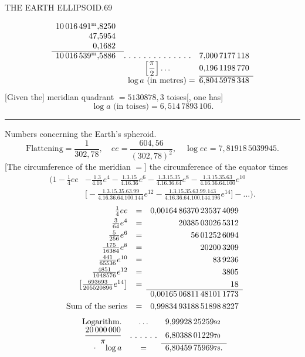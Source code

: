 \clearpage
\noindent\mbox{}\hfill THE EARTH ELLIPSOID.\hfill 69\par
\[
\begin{array}{r@{\quad}c@{\quad}r}
10\,016\,491^{\mathrm m}{,}8250&&\\
47{,}5954&&\\
0{,}1682&&\\\cline{1-1}
10\,016\,539^{\mathrm m}{,}5886&\ldotp\,\ldotp\,\ldotp\,\ldotp\,\ldotp\,\ldotp\,\ldotp\,\ldotp\,\ldotp\,\ldotp\,\ldotp\,\ldotp\,\ldotp\,\ldotp&7{,}000\,7177\,118\\
&\left[\dfrac\pi2\right]\ldots&0{,}196\,1198\,770\\\cline{3-3}
\multicolumn{2}{r}{\log a\text{ (in metres)}=}&6{,}804\,5978\,348
\end{array}
\]
[Given the] meridian quadrant $=5130878{,}3$ toises[, one has]
\[
\log a\text{ (in toises)}=6{,}514\,7893\,106.
\]
\begin{center}\rule{.25\textwidth}{.4pt}\end{center}
Numbers concerning the Earth's spheroid.
\[
\text{Flattening}=\frac1{302{,}78},\quad ee=\frac{604{,}56}{(302{,}78)^2},\quad\log ee=7{,}81918\,50399{\scriptstyle45}.
\]
[The circumference of the meridian $=$] the circumference of the equator times
\[
\begin{aligned}
\bigg(1-\tfrac14ee&-\frac{1.3}{4.16}e^4-\frac{1.3.15}{4.16.36}e^6-\frac{1.3.15.35}{4.16.36.64}e^8-\frac{1.3.15.35.63}{4.16.36.64.100}e^{10}\\
&\bigg[-\frac{1.3.15.35.63.99}{4.16.36.64.100.144}e^{12}-\frac{1.3.15.35.63.99.143}{4.16.36.64.100.144.196}e^{14}\bigg]-\ldots\bigg).
\end{aligned}
\]
\[
\begin{array}{rcl}
\tfrac14ee&=&\multicolumn{1}{r}{0{,}00164\,86370\,23537\,4099}\\[3pt]
\tfrac3{64}e^4&=&\multicolumn{1}{r}{20385\,03026\,5312}\\[3pt]
\tfrac5{256}e^6&=&\multicolumn{1}{r}{56\,01252\,6094}\\[3pt]
\tfrac{175}{16384}e^8&=&\multicolumn{1}{r}{20200\,3209}\\[3pt]
\tfrac{441}{65536}e^{10}&=&\multicolumn{1}{r}{83\,9236}\\[3pt]
\tfrac{4851}{1048576}e^{12}&=&\multicolumn{1}{r}{3805}\\[3pt]
\left[\tfrac{693693}{205520896}e^{14}\right]&=&\multicolumn{1}{r}{18}\\\cline{3-3}
&&0{,}00165\,06811\,48101\,1773\\[3pt]
\text{Sum of the series}&=&0{,}99834\,93188\,51898\,8227
\end{array}
\]
\[
\begin{array}{rcl}
\text{Logarithm.}&\ldots&9{,}99928\,25259{\scriptstyle92}\\
\dfrac{20\,000\,000}{\pi}&\ldotp\,\ldotp\,\ldotp\,\ldotp\,\ldotp\,\ldotp&6{,}80388\,01229{\scriptstyle70}\\\cline{3-3}
\text{\raisebox{.5ex}{.}}\quad\log a&=&6{,}80459\,75969{\scriptstyle78}.
\end{array}
\]

